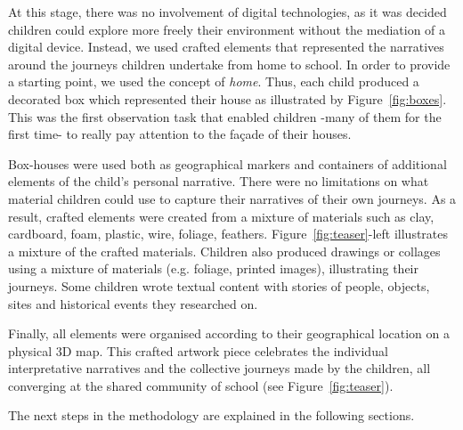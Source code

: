 \documentclass[acmlarge,screen,dvipsnames]{acmart}
\begin{document}
At this stage, there was no involvement of digital technologies, as it was
decided children could explore more freely their environment without the
mediation of a digital device. Instead, we used crafted elements that represented 
the narratives around the journeys children undertake from home to school. 
In order to provide a starting point, we used the concept of \emph{home}. Thus, each child produced a decorated box
which represented their house as illustrated by Figure~\ref{fig:boxes}. This
was the first observation task that enabled children -many of them for the first time-
to really pay attention to the fa\c{c}ade of their houses. 


Box-houses were used both
as geographical markers and containers of additional elements of the child's personal narrative. 
There were no
limitations on what material children could use to capture their narratives of their own journeys.
As a result, crafted elements were created from a mixture of materials such as
clay, cardboard, foam, plastic, wire, foliage, feathers.
Figure~\ref{fig:teaser}-left illustrates a mixture of the crafted materials. Children also produced drawings or collages using a
mixture of materials (e.g. foliage, printed images), illustrating their
journeys. Some children wrote
textual content with stories of people, objects, sites and historical events they
researched on.

Finally, all elements were organised according to their geographical location
on a physical 3D map. This crafted artwork piece celebrates the individual
interpretative narratives and the collective journeys made by the children, all
converging at the shared community of school (see Figure~\ref{fig:teaser}). 


The next steps in the methodology are explained in the following sections.

\end{document}
